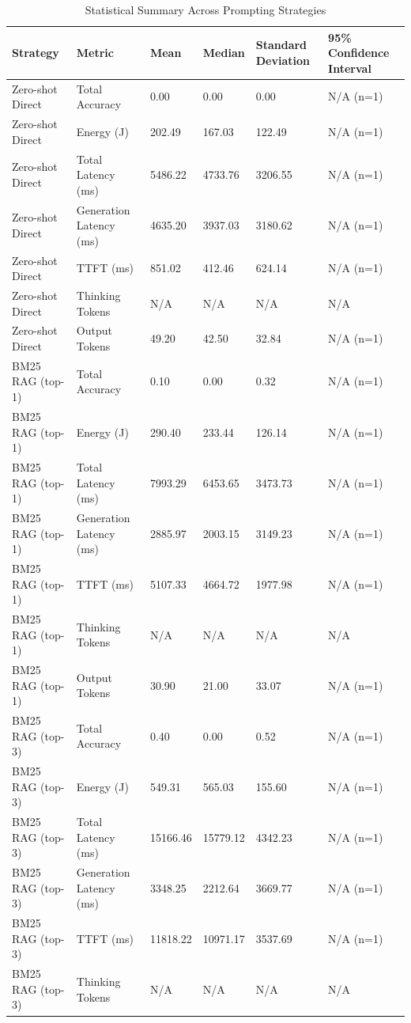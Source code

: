 \begin{table}
\caption{Statistical Summary Across Prompting Strategies}
\label{tab:statistical_summary}
\begin{tabular}{llllll}
\toprule
Strategy & Metric & Mean & Median & Standard Deviation & 95\% Confidence Interval \\
\midrule
Zero-shot Direct & Total Accuracy & 0.00 & 0.00 & 0.00 & N/A (n=1) \\
Zero-shot Direct & Energy (J) & 202.49 & 167.03 & 122.49 & N/A (n=1) \\
Zero-shot Direct & Total Latency (ms) & 5486.22 & 4733.76 & 3206.55 & N/A (n=1) \\
Zero-shot Direct & Generation Latency (ms) & 4635.20 & 3937.03 & 3180.62 & N/A (n=1) \\
Zero-shot Direct & TTFT (ms) & 851.02 & 412.46 & 624.14 & N/A (n=1) \\
Zero-shot Direct & Thinking Tokens & N/A & N/A & N/A & N/A \\
Zero-shot Direct & Output Tokens & 49.20 & 42.50 & 32.84 & N/A (n=1) \\
BM25 RAG (top-1) & Total Accuracy & 0.10 & 0.00 & 0.32 & N/A (n=1) \\
BM25 RAG (top-1) & Energy (J) & 290.40 & 233.44 & 126.14 & N/A (n=1) \\
BM25 RAG (top-1) & Total Latency (ms) & 7993.29 & 6453.65 & 3473.73 & N/A (n=1) \\
BM25 RAG (top-1) & Generation Latency (ms) & 2885.97 & 2003.15 & 3149.23 & N/A (n=1) \\
BM25 RAG (top-1) & TTFT (ms) & 5107.33 & 4664.72 & 1977.98 & N/A (n=1) \\
BM25 RAG (top-1) & Thinking Tokens & N/A & N/A & N/A & N/A \\
BM25 RAG (top-1) & Output Tokens & 30.90 & 21.00 & 33.07 & N/A (n=1) \\
BM25 RAG (top-3) & Total Accuracy & 0.40 & 0.00 & 0.52 & N/A (n=1) \\
BM25 RAG (top-3) & Energy (J) & 549.31 & 565.03 & 155.60 & N/A (n=1) \\
BM25 RAG (top-3) & Total Latency (ms) & 15166.46 & 15779.12 & 4342.23 & N/A (n=1) \\
BM25 RAG (top-3) & Generation Latency (ms) & 3348.25 & 2212.64 & 3669.77 & N/A (n=1) \\
BM25 RAG (top-3) & TTFT (ms) & 11818.22 & 10971.17 & 3537.69 & N/A (n=1) \\
BM25 RAG (top-3) & Thinking Tokens & N/A & N/A & N/A & N/A \\

\end{tabular}
\end{table}
